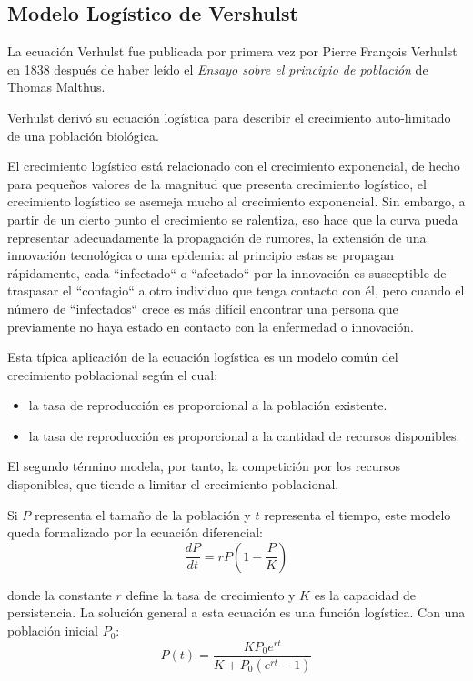 \subsection{Modelo Logístico de Vershulst}
La ecuación Verhulst fue publicada por primera vez por Pierre François Verhulst en 1838 después de haber leído el \textit{Ensayo sobre el principio de población} de Thomas Malthus.

Verhulst derivó su ecuación logística para describir el crecimiento auto-limitado de una población biológica.

El crecimiento logístico está relacionado con el crecimiento exponencial, de hecho para pequeños valores de la magnitud que presenta crecimiento logístico, el crecimiento logístico se asemeja mucho al crecimiento exponencial. Sin embargo, a partir de un cierto punto el crecimiento se ralentiza, eso hace que la curva pueda representar adecuadamente la propagación de rumores, la extensión de una innovación tecnológica o una epidemia: al principio estas se propagan rápidamente, cada ``infectado`` o ``afectado`` por la innovación es susceptible de traspasar el ``contagio`` a otro individuo que tenga contacto con él, pero cuando el número de ``infectados`` crece es más difícil encontrar una persona que previamente no haya estado en contacto con la enfermedad o innovación.

Esta típica aplicación de la ecuación logística es un modelo común del crecimiento poblacional según el cual:
\begin{itemize}
    \item la tasa de reproducción es proporcional a la población existente.
    \item la tasa de reproducción es proporcional a la cantidad de recursos disponibles.
\end{itemize}

El segundo término modela, por tanto, la competición por los recursos disponibles, que tiende a limitar el crecimiento poblacional.

Si $P$ representa el tamaño de la población y $t$ representa el tiempo, este modelo queda formalizado por la ecuación diferencial:
\begin{equation}
   \frac{dP}{dt} = rP(1 - \frac{P}{K})
\end{equation}

donde la constante $r$ define la tasa de crecimiento y $K$ es la capacidad de persistencia. La soluci\'on general a esta ecuación es una funci\'on logística. Con una poblaci\'on inicial $P_{0}$:
\begin{equation}
    P(t) = \frac{KP_{0}e^{rt}}{K + P_{0}(e^{rt} - 1)}
 \end{equation}


